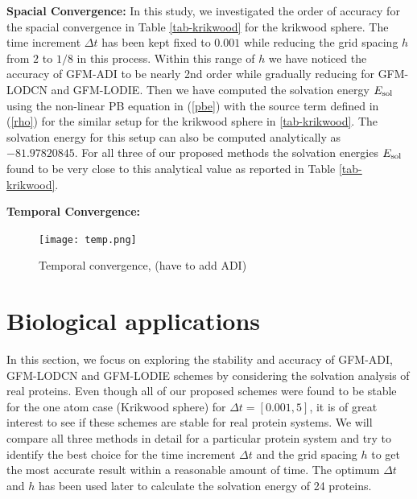 \textbf{Spacial Convergence:}  In this study, we investigated the order of  accuracy for the spacial convergence in Table \ref{tab-krikwood} for the krikwood sphere. The time increment $\Delta t$ has been kept fixed to $0.001$ while reducing the grid spacing $h$ from $2$ to $1/8$ in this process. Within this range of $h$ we have noticed the accuracy of GFM-ADI to be nearly 2nd order while gradually reducing for GFM-LODCN and GFM-LODIE. Then we have computed the solvation energy $E_{\rm sol}$ using the non-linear PB equation in (\ref{pbe}) with the source term defined in (\ref{rho}) for the similar setup for the krikwood sphere in \ref{tab-krikwood}. The solvation energy for this setup can also be computed analytically as $-81.97820845$. For all three of our proposed methods the solvation energies $E_{\rm sol}$ found to be very close to this analytical value as reported in Table \ref{tab-krikwood}. 

\textbf{Temporal Convergence:}

\begin{figure}[!ht]
	\centering
	\texttt{[image: temp.png]}
	\caption{Temporal convergence, (have to add ADI)}
\end{figure}
   
\section{Biological applications}

In this section, we focus on exploring the stability and accuracy of GFM-ADI, GFM-LODCN and GFM-LODIE schemes by considering the solvation analysis of real proteins. Even though all of our proposed schemes were found to be stable for the one atom case (Krikwood sphere) for $\Delta t =[0.001,5]$, it is of great interest to see if these schemes are stable for real protein systems. We will compare all three methods in detail for a particular protein system and try to identify the best choice for the time increment $\Delta t $ and the grid spacing $h$ to get the most accurate result within a reasonable amount of time. The optimum $\Delta t$ and $h$ has been used later to calculate the solvation energy of 24 proteins.      


